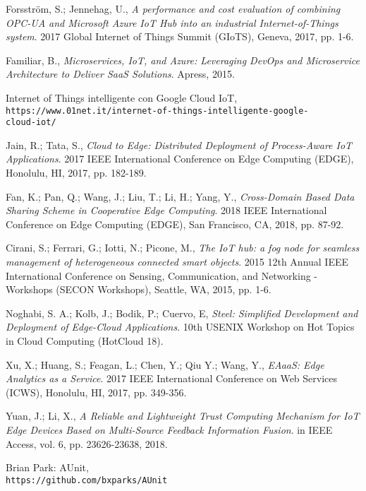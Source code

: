 \documentclass[a4paper,12pt,oneside]{book}
\begin{document}
\begin{thebibliography}{9}
	Forsström, S.; Jennehag, U., 
	\textit{A performance and cost evaluation of combining OPC-UA and Microsoft Azure IoT Hub into an industrial Internet-of-Things system}. 
	2017 Global Internet of Things Summit (GIoTS), Geneva, 2017, pp. 1-6.
	
	Familiar, B., 
	\textit{Microservices, IoT, and Azure: Leveraging DevOps and Microservice Architecture to Deliver SaaS Solutions}. 
	Apress, 2015.
	
	Internet of Things intelligente con Google Cloud IoT,
	\\\texttt{https://www.01net.it/internet-of-things-intelligente-google-\\cloud-iot/}
	
	Jain, R.; Tata, S., 
	\textit{Cloud to Edge: Distributed Deployment of Process-Aware IoT Applications}. 
	2017 IEEE International Conference on Edge Computing (EDGE), Honolulu, HI, 2017, pp. 182-189.
	
	Fan, K.; Pan, Q.; Wang, J.; Liu, T.; Li, H.; Yang, Y., 
	\textit{Cross-Domain Based Data Sharing Scheme in Cooperative Edge Computing}. 
	2018 IEEE International Conference on Edge Computing (EDGE), San Francisco, CA, 2018, pp. 87-92.
	
	Cirani, S.; Ferrari, G.; Iotti, N.; Picone, M., 
	\textit{The IoT hub: a fog node for seamless management of heterogeneous connected smart objects}. 
	2015 12th Annual IEEE International Conference on Sensing, Communication, and Networking - Workshops (SECON Workshops), Seattle, WA, 2015, pp. 1-6.
	
	Noghabi, S. A.; Kolb, J.; Bodik, P.; Cuervo, E, 
	\textit{Steel: Simplified Development and Deployment of Edge-Cloud Applications}. 
	10th {USENIX} Workshop on Hot Topics in Cloud Computing (HotCloud 18).
	
	Xu, X.; Huang, S.; Feagan, L.; Chen, Y.; Qiu Y.; Wang, Y., 
	\textit{EAaaS: Edge Analytics as a Service}.
	2017 IEEE International Conference on Web Services (ICWS), Honolulu, HI, 2017, pp. 349-356.
	
	Yuan, J.; Li, X., 
	\textit{A Reliable and Lightweight Trust Computing Mechanism for IoT Edge Devices Based on Multi-Source Feedback Information Fusion}. 
	in IEEE Access, vol. 6, pp. 23626-23638, 2018.
	
	Brian Park: AUnit,
	\\\texttt{https://github.com/bxparks/AUnit}
	
	
\end{thebibliography}
\end{document}
